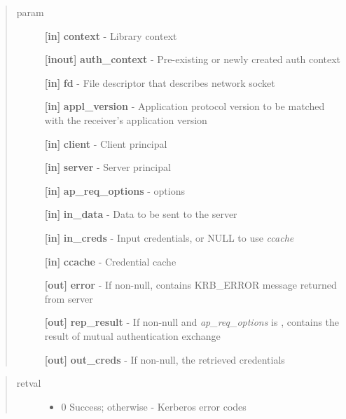 \documentclass[letterpaper,10pt,english]{sphinxmanual}
\begin{document}
\begin{quote}\begin{description}
\item[{param}] \leavevmode
\textbf{{[}in{]}} \textbf{context} - Library context

\textbf{{[}inout{]}} \textbf{auth\_context} - Pre-existing or newly created auth context

\textbf{{[}in{]}} \textbf{fd} - File descriptor that describes network socket

\textbf{{[}in{]}} \textbf{appl\_version} - Application protocol version to be matched with the receiver's application version

\textbf{{[}in{]}} \textbf{client} - Client principal

\textbf{{[}in{]}} \textbf{server} - Server principal

\textbf{{[}in{]}} \textbf{ap\_req\_options} -  options

\textbf{{[}in{]}} \textbf{in\_data} - Data to be sent to the server

\textbf{{[}in{]}} \textbf{in\_creds} - Input credentials, or NULL to use \emph{ccache}

\textbf{{[}in{]}} \textbf{ccache} - Credential cache

\textbf{{[}out{]}} \textbf{error} - If non-null, contains KRB\_ERROR message returned from server

\textbf{{[}out{]}} \textbf{rep\_result} - If non-null and \emph{ap\_req\_options} is {\hyperref[appdev/refs/macros/AP_OPTS_MUTUAL_REQUIRED:AP_OPTS_MUTUAL_REQUIRED]{}} , contains the result of mutual authentication exchange

\textbf{{[}out{]}} \textbf{out\_creds} - If non-null, the retrieved credentials

\end{description}\end{quote}
\begin{quote}\begin{description}
\item[{retval}] \leavevmode\begin{itemize}
\item {} 
0   Success; otherwise - Kerberos error codes

\end{itemize}

\end{description}\end{quote}
\end{document}
